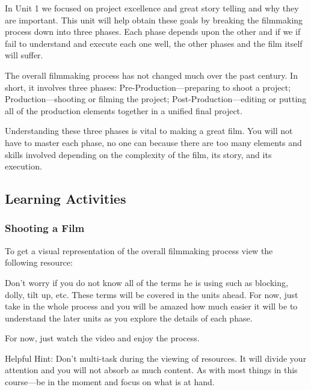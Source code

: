 \documentclass[
]{book}
\begin{document}
In Unit 1 we focused on project excellence and great story telling and why they are important. This unit will help obtain these goals by breaking the filmmaking process down into three phases. Each phase depends upon the other and if we if fail to understand and execute each one well, the other phases and the film itself will suffer.

The overall filmmaking process has not changed much over the past century. In short, it involves three phases: Pre-Production---preparing to shoot a project; Production---shooting or filming the project; Post-Production---editing or putting all of the production elements together in a unified final project.

Understanding these three phases is vital to making a great film. You will not have to master each phase, no one can because there are too many elements and skills involved depending on the complexity of the film, its story, and its execution.

\hypertarget{learning-activities-3}{%
\subsection*{Learning Activities}\label{learning-activities-3}}

\begin{reflect}
\hypertarget{shooting-a-film}{%
\subsubsection*{Shooting a Film}\label{shooting-a-film}}

To get a visual representation of the overall filmmaking process view the following resource:

Don't worry if you do not know all of the terms he is using such as blocking, dolly, tilt up, etc. These terms will be covered in the units ahead. For now, just take in the whole process and you will be amazed how much easier it will be to understand the later units as you explore the details of each phase.

For now, just watch the video and enjoy the process.

Helpful Hint: Don't multi-task during the viewing of resources. It will divide your attention and you will not absorb as much content. As with most things in this course---be in the moment and focus on what is at hand.
\end{reflect}
\end{document}
